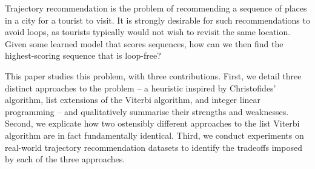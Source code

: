 
Trajectory recommendation is the problem of recommending a sequence of places in a city for a tourist to visit.
It is strongly desirable for such recommendations to avoid loops, as tourists typically would not wish to revisit the same location.
Given some learned model that scores sequences, how can we then find the highest-scoring sequence that is loop-free?

This paper studies this problem, with three contributions.
First, we detail three distinct approaches to the problem -- a heuristic inspired by Christofides' algorithm, list extensions of the Viterbi algorithm, and integer linear programming -- and qualitatively summarise their strengths and weaknesses.
Second, we explicate how two ostensibly different approaches to the list Viterbi algorithm \citep{seshadri1994list,nilsson2001sequentially} are in fact fundamentally identical.
Third, we conduct experiments on real-world trajectory recommendation datasets to identify the tradeoffs imposed by each of the three approaches.
